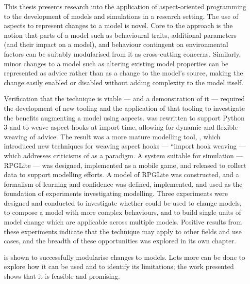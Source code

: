 This thesis presents research into the application of aspect-oriented
programming to the development of models and simulations in a research setting. The use of aspects to
represent changes to a model is novel. Core to the approach is the notion that
parts of a model such as behavioural traits, additional parameters (and their
impact on a model), and behaviour contingent on environmental factors can be
suitably modularised from it as cross-cutting concerns. Similarly, minor changes
to a model such as altering existing model properties can be represented as
advice rather than as a change to the model's source, making the change easily
enabled or disabled without adding complexity to the model itself.

Verification that the technique is viable --- and a demonstration of it ---
required the development of new tooling and the application of that tooling to
investigate the benefits augmenting a model using aspects. \pydysofu{} was
rewritten to support Python 3 and to weave aspect hooks at import time, allowing
for dynamic and flexible weaving of advice. The result was a more mature
\aspectoriented modelling tool, \pdsfthree{}, which introduced new techniques
for weaving aspect hooks --- ``import hook weaving --- which addresses
criticisms of \aop{} as a paradigm. A system suitable for simulation --- RPGLite
--- was designed, implemented as a mobile game, and released to collect data to
support modelling efforts. A model of RPGLite was constructed, and a formalism
of learning and confidence was defined, implemented, and used as the foundation
of experiments investigating \aspectoriented{} modelling. Three experiments were
designed and conducted to investigate whether \aop{} could be used to change
models, to compose a model with more complex behaviours, and to build single
units of model change which are applicable across multiple models. Positive
results from these experiments indicate that the technique may apply to other
fields and use cases, and the breadth of these opportunities was explored in its
own chapter.


\Aop{} is shown to successfully modularise changes to models. Lots more can be
done to explore how it can be used and to identify its limitations; the work
presented shows that it is feasible and promising.





